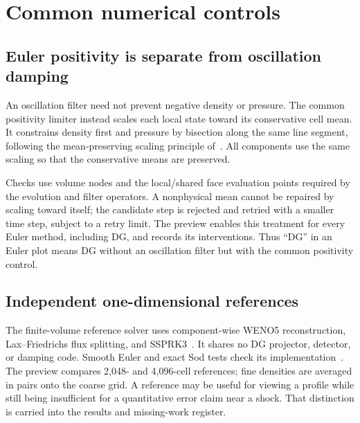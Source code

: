 \section{Common numerical controls}
\label{sec:numerical-controls}
\subsection{Euler positivity is separate from oscillation damping}
An oscillation filter need not prevent negative density or pressure. The common
positivity limiter instead scales each local state toward its conservative
cell mean. It constrains density first and pressure by bisection along the same
line segment, following the mean-preserving scaling principle
of~\cite{ZhangShu2010}. All components use the same scaling so that the
conservative means are preserved.

Checks use volume nodes and the local/shared face evaluation points required
by the evolution and filter operators. A nonphysical mean cannot be repaired
by scaling toward itself; the candidate step is rejected and retried with a
smaller time step, subject to a retry limit. The preview enables this treatment
for every Euler method, including DG, and records its interventions. Thus
``DG'' in an Euler plot means DG without an oscillation filter but with the
common positivity control.

\subsection{Independent one-dimensional references}
The finite-volume reference solver uses component-wise WENO5 reconstruction,
Lax--Friedrichs flux splitting, and SSPRK3~\cite{JiangShu1996,GottliebShu1998}.
It shares no DG projector, detector, or damping code. Smooth Euler and exact
Sod tests check its implementation~\cite{Sod1978}. The preview compares
2,048- and 4,096-cell references; fine densities are averaged in pairs onto the
coarse grid. A reference may be useful for viewing a profile while still being
insufficient for a quantitative error claim near a shock. That distinction is
carried into the results and missing-work register.

